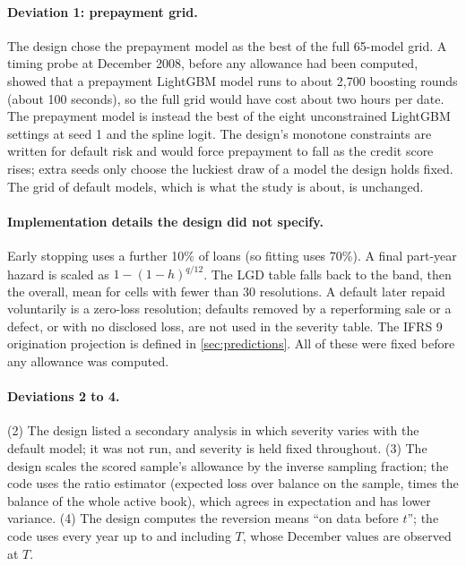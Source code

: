 \paragraph{Deviation 1: prepayment grid.} The design chose the prepayment
model as the best of the full 65-model grid. A timing probe at December 2008,
before any allowance had been computed, showed that a prepayment LightGBM
model runs to about 2,700 boosting rounds (about 100 seconds), so the full grid
would have cost about two hours per date. The prepayment model is instead the
best of the eight unconstrained LightGBM settings at seed 1 and the spline
logit. The design's monotone constraints are written for default risk and
would force prepayment to fall as the credit score rises; extra seeds only
choose the luckiest draw of a model the design holds fixed. The grid of
default models, which is what the study is about, is unchanged.

\paragraph{Implementation details the design did not specify.} Early stopping
uses a further 10\% of loans (so fitting uses 70\%). A final part-year hazard
is scaled as $1-(1-h)^{q/12}$. The LGD table falls back to the band, then the
overall, mean for cells with fewer than 30 resolutions. A default later
repaid voluntarily is a zero-loss resolution; defaults removed by a
reperforming sale or a defect, or with no disclosed loss, are not used in the
severity table. The IFRS 9 origination projection is defined in
\cref{sec:predictions}. All of these were fixed before any allowance was
computed.

\paragraph{Deviations 2 to 4.} (2) The design listed a secondary analysis in
which severity varies with the default model; it was not run, and severity is
held fixed throughout. (3) The design scales the scored sample's allowance by
the inverse sampling fraction; the code uses the ratio estimator (expected
loss over balance on the sample, times the balance of the whole active
book), which agrees in expectation and has lower variance. (4) The design
computes the reversion means ``on data before $t$''; the code uses every year
up to and including $T$, whose December values are observed at $T$.

